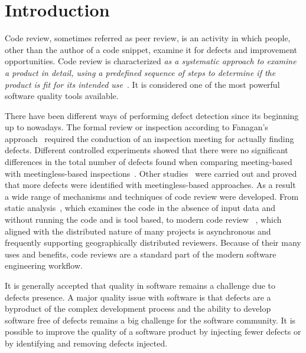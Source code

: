 \documentclass[ifip]{svmult}
\begin{document}
\section{Introduction}
\label{sec:1}

Code review, sometimes referred as peer review, is an activity in which people, other than the author of a code snippet, 
examine it for defects and improvement opportunities.
Code review is characterized \textit{as a systematic approach to examine a product in detail, 
using a predefined sequence of steps to determine if the product is fit for its intended use}~\cite{contribution14}. It is considered one of the most powerful software quality tools available. 


There have been different ways of performing defect detection since its beginning up to nowadays. The formal review or inspection 
according to Fanagan's approach~\cite{contribution15} required the conduction of an inspection meeting for actually finding defects. Different controlled experiments showed that there were no significant differences in the total number of defects found 
when comparing meeting-based with meetingless-based inspections~\cite{contribution17, contribution18}. Other 
studies~\cite{contribution19} were carried out and proved that more defects were identified with meetingless-based approaches. 
As a result a wide range of mechanisms and techniques of code review were developed. From static analysis~\cite{contribution3, contribution4, contribution5}, which examines the code in 
the absence of input data and without running the code and is tool based, to modern code review~ 
\cite{contribution6. contribution7, contribution8}, which aligned with the distributed 
nature of many projects is asynchronous and frequently supporting geographically distributed reviewers. Because of their many uses 
and benefits, code reviews are a standard part of the modern software engineering workflow.

It is generally accepted that quality in software remains a challenge due to defects presence. A major quality issue with 
software is that defects are a byproduct of the complex development process and the ability to develop software free of defects 
remains a big challenge for the software community. 
It is possible to improve the quality of a software product by injecting fewer defects or by identifying and 
removing defects injected. 
\end{document}
